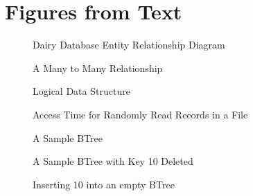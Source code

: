 \documentclass[letterpaper,10pt,english]{sphinxmanual}
\begin{document}
\section{Figures from Text}
\label{\detokenize{chap10/chap10:figures-from-text}}
\begin{figure}[htbp]
\centering
\capstart

\noindent{}
\caption{Dairy Database Entity Relationship Diagram}\label{\detokenize{chap10/chap10:id1}}\end{figure}

\begin{figure}[htbp]
\centering
\capstart

\noindent{}
\caption{A Many to Many Relationship}\label{\detokenize{chap10/chap10:id2}}\end{figure}

\begin{figure}[htbp]
\centering
\capstart

\noindent{}
\caption{Logical Data Structure}\label{\detokenize{chap10/chap10:id3}}\end{figure}

\begin{figure}[htbp]
\centering
\capstart

\noindent{}
\caption{Access Time for Randomly Read Records in a File}\label{\detokenize{chap10/chap10:id4}}\end{figure}

\begin{figure}[htbp]
\centering
\capstart

\noindent{}
\caption{A Sample B\sphinxhyphen{}Tree}\label{\detokenize{chap10/chap10:id5}}\end{figure}

\begin{figure}[htbp]
\centering
\capstart

\noindent{}
\caption{A Sample B\sphinxhyphen{}Tree with Key 10 Deleted}\label{\detokenize{chap10/chap10:id6}}\end{figure}

\begin{figure}[htbp]
\centering
\capstart

\noindent{}
\caption{Inserting 10 into an empty B\sphinxhyphen{}Tree}\label{\detokenize{chap10/chap10:id7}}\end{figure}
\end{document}
